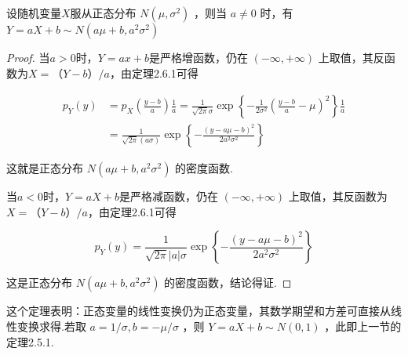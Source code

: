 \begin{theorem}
	设随机变量$ X $服从正态分布 $N\left(\mu, \sigma^{2}\right)$ ，则当 $a \neq 0$ 时，有$ Y= a X+b \sim N\left(a \mu+b, a^{2} \sigma^{2}\right) $
\end{theorem}

\begin{proof}
	当$ a>0 $时，$ Y=ax+b $是严格增函数，仍在 $(-\infty,+\infty)$ 上取值，其反函数为$ X=（Y-b）/a $，由定理2.6.1可得
	
	\[
	\begin{aligned} p_{Y}(y) &=p_{X}\left(\frac{y-b}{a}\right) \frac{1}{a}=\frac{1}{\sqrt{2 \pi} \sigma} \exp \left\{-\frac{1}{2 \sigma^{2}}\left(\frac{y-b}{a}-\mu\right)^{2}\right\} \frac{1}{a} \\ &=\frac{1}{\sqrt{2 \pi}(a \sigma)} \exp \left\{-\frac{(y-a \mu-b)^{2}}{2 a^{2} \sigma^{2}}\right\} \end{aligned}
	\]
	
	这就是正态分布 $N\left(a \mu+b, a^{2} \sigma^{2}\right)$ 的密度函数.
	
	当$ a<0 $时，$ Y=aX+b $是严格减函数，仍在 $(-\infty,+\infty)$ 上取值，其反函数为$ X=（Y-b）/a $，由定理2.6.1可得
	
	\[
	p_{Y}(y)=\frac{1}{\sqrt{2 \pi}|a| \sigma} \exp \left\{-\frac{(y-a \mu-b)^{2}}{2 a^{2} \sigma^{2}}\right\}
	\]
	
	这是正态分布 $N\left(a \mu+b, a^{2} \sigma^{2}\right)$ 的密度函数，结论得证.
	
\end{proof}

这个定理表明：正态变量的线性变换仍为正态变量，其数学期望和方差可直接从线性变换求得.若取 $a=1 / \sigma, b=-\mu / \sigma$ ，则 $Y=a X+b \sim N(0,1)$ ，此即上一节的定理2.5.1.


